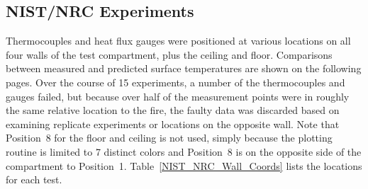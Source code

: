 \clearpage


\subsection{NIST/NRC Experiments}

Thermocouples and heat flux gauges were positioned at various locations on all four walls of the test compartment, plus the ceiling and floor. Comparisons between measured and predicted surface temperatures are shown on the following pages. Over the course of 15 experiments, a number of the thermocouples and gauges failed, but because over half of the measurement points were in roughly the same relative location to the fire, the faulty data was discarded based on examining replicate experiments or locations on the opposite wall. Note that Position~8 for the floor and ceiling is not used, simply because the plotting routine is limited to 7 distinct colors and Position~8 is on the opposite side of the compartment to Position~1. Table~\ref{NIST_NRC_Wall_Coords} lists the locations for each test.

